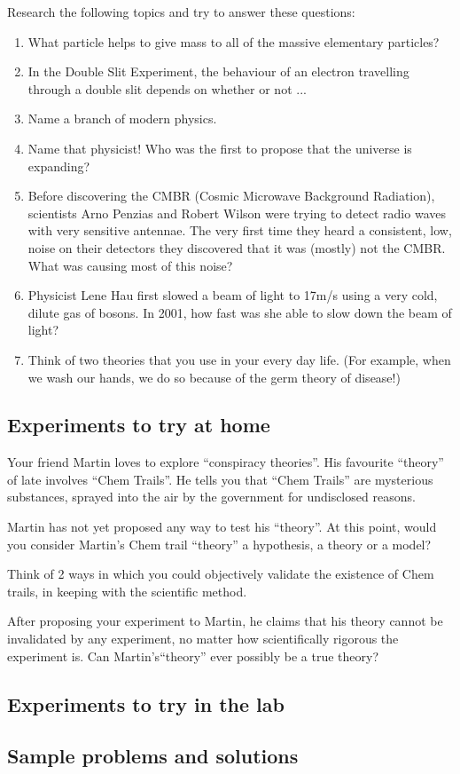 Research the following topics and try to answer these questions:
\begin{enumerate}
\item What particle helps to give mass to all of the massive elementary particles?
\item In the Double Slit Experiment, the behaviour of an electron travelling through a double slit depends on whether or not ...
\item Name a branch of modern physics.
\item Name that physicist! Who was the first to propose that the universe is expanding?
\item Before discovering the CMBR (Cosmic Microwave Background Radiation), scientists Arno Penzias and Robert Wilson were trying to detect radio waves with very sensitive antennae. The very first time they heard a consistent, low, noise on their detectors they discovered that it was (mostly) not the CMBR. What was causing most of this noise?
\item Physicist Lene Hau first slowed a beam of light to 17m/s using a very cold, dilute gas of bosons. In 2001, how fast was she able to slow down the beam of light?
\item Think of two theories that you use in your every day life. (For example, when we wash our hands, we do so because of the germ theory of disease!)
\end{enumerate}

\subsection{Experiments to try at home}
\vspace{0.5cm}
\begin{problemParts}{Your friend Martin loves to explore ``conspiracy theories''. His favourite ``theory'' of late involves ``Chem Trails''. He tells you that ``Chem Trails'' are mysterious substances, sprayed into the air by the government for undisclosed reasons.}
\item Martin has not yet proposed any way to test his ``theory''. At this point, would you consider Martin's Chem trail ``theory'' a hypothesis, a theory or a model?
\item Think of 2 ways in which you could objectively validate the existence of Chem trails, in keeping with the scientific method.
\item After proposing your experiment to Martin, he claims that his theory cannot be invalidated by any experiment, no matter how scientifically rigorous the experiment is. Can Martin's``theory'' ever possibly be a true theory?
\end{problemParts}

\subsection{Experiments to try in the lab}

\subsection{Sample problems and solutions}
